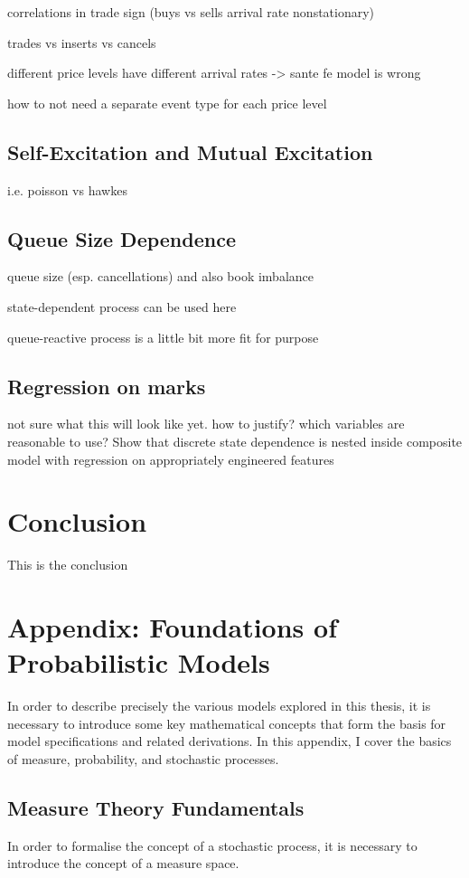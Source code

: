 \documentclass[honours,12pt]{unswthesis}
\numberwithin{equation}{section}
\begin{document}
correlations in trade sign (buys vs sells arrival rate nonstationary)

trades vs inserts vs cancels

different price levels have different arrival rates -> sante fe model is wrong

how to not need a separate event type for each price level

\section{Self-Excitation and Mutual Excitation}
i.e. poisson vs hawkes

\section{Queue Size Dependence}
queue size (esp. cancellations) and also book imbalance

state-dependent process can be used here

queue-reactive process is a little bit more fit for purpose

\section{Regression on marks}
not sure what this will look like yet. how to justify? which variables are reasonable to use?
Show that discrete state dependence is nested inside composite model with regression on appropriately engineered features


\chapter{Conclusion}\label{ccl}


This is the conclusion


\chapter{Appendix: Foundations of Probabilistic Models}
In order to describe precisely the various models explored in this thesis, it is necessary to introduce some key mathematical concepts that form the basis for model specifications and related derivations. In this appendix, I cover the basics of measure, probability, and stochastic processes.

\section{Measure Theory Fundamentals}
In order to formalise the concept of a stochastic process, it is necessary to introduce the concept of a measure space.
\end{document}
